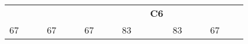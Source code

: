 \begin{landscape}
\begin{table}[h!]
\begin{tabular}{lcllcllcllcllcllcl}
\multicolumn{1}{l|}{}     & \multicolumn{1}{c|}{}                                                                                                   &                              & \multicolumn{1}{l|}{}   & \multicolumn{1}{c|}{}                                                                                                      &                               & \multicolumn{1}{l|}{}   & \multicolumn{1}{c|}{}                                                                                                   & {\bf }                        & \multicolumn{1}{l|}{}   & \multicolumn{1}{c|}{}                                                                                            & {\bf C6}                      & \multicolumn{1}{l|}{}   & \multicolumn{1}{c|}{}                                                                                                              &                               & \multicolumn{1}{l|}{}   & \multicolumn{1}{c|}{}                                                                                                        &                               \\ \cline{1-1} \cline{3-4} \cline{6-7} \cline{9-10} \cline{12-13} \cline{15-16} \cline{18-18} 
\multicolumn{1}{|l|}{67}  & \multicolumn{1}{c|}{}                                                                                                   & \multicolumn{1}{l|}{}        & \multicolumn{1}{l|}{67} & \multicolumn{1}{c|}{}                                                                                                      & \multicolumn{1}{l|}{}         & \multicolumn{1}{l|}{67} & \multicolumn{1}{c|}{}                                                                                                   & \multicolumn{1}{l|}{}         & \multicolumn{1}{l|}{83} & \multicolumn{1}{c|}{}                                                                                            & \multicolumn{1}{l|}{}         & \multicolumn{1}{l|}{83} & \multicolumn{1}{c|}{}                                                                                                              & \multicolumn{1}{l|}{}         & \multicolumn{1}{l|}{67} & \multicolumn{1}{c|}{}                                                                                                        & \multicolumn{1}{l|}{}         \\ \hline

\end{tabular}
\end{table}
\end{landscape}
